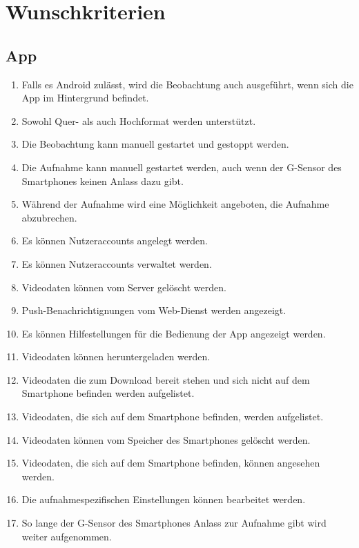\section{Wunschkriterien}
\subsection{App}
	\begin{enumerate}
	\renewcommand{\labelenumi}{\textbf{\theenumi}}
	\renewcommand{\theenumi}{WK\arabic{enumi}0}
	\setcounter{enumi}{99}
	\item Falls es \gls{Android} zulässt, wird die Beobachtung auch ausgeführt, wenn sich die \gls{App} im Hintergrund befindet.
	\item Sowohl Quer- als auch Hochformat werden unterstützt.
	\item Die Beobachtung kann manuell gestartet und gestoppt werden.
	\item Die Aufnahme kann manuell gestartet werden, auch wenn der \gls{G-Sensor} des Smartphones keinen Anlass dazu gibt.
	\item Während der Aufnahme wird eine Möglichkeit angeboten, die Aufnahme abzubrechen.
	\item Es können Nutzeraccounts angelegt werden.
	\item Es können Nutzeraccounts verwaltet werden.
	\item {} Videodaten können vom Server gelöscht werden.
	\item Push-Benachrichtignungen vom \gls{Web-Dienst} werden angezeigt.
	\item Es können Hilfestellungen für die Bedienung der \gls{App} angezeigt werden.
	\item {} Videodaten können heruntergeladen werden.
	\item {} Videodaten die zum Download bereit stehen und sich nicht auf dem \gls{Smartphone} befinden werden aufgelistet.
	\item {} Videodaten, die sich auf dem \gls{Smartphone} befinden, werden aufgelistet.
	\item {} Videodaten können vom Speicher des \glspl{Smartphone} gelöscht werden.
	\item {} Videodaten, die sich auf dem \gls{Smartphone} befinden, können angesehen werden.
	\item Die aufnahmespezifischen Einstellungen können bearbeitet werden.
	\item So lange der \gls{G-Sensor} des Smartphones Anlass zur Aufnahme gibt wird weiter aufgenommen.
	\end{enumerate}
